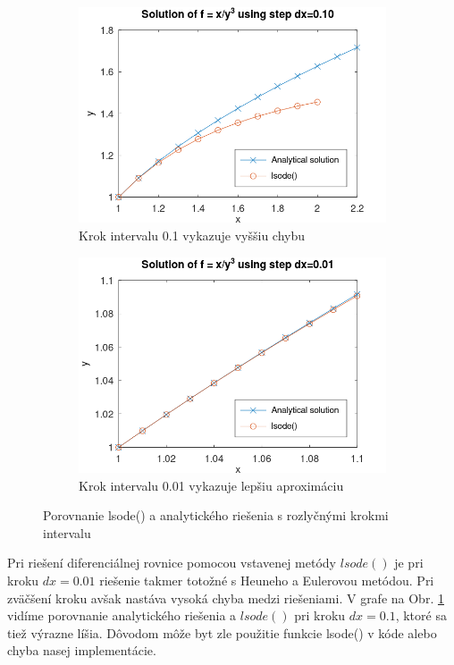 \documentclass{article}
\theoremstyle{definition}
\theoremstyle{remark}
\begin{document}
\begin{figure}[h]
  \centering
  \begin{subfigure}[b]{0.49\textwidth}
    \includegraphics[width=\textwidth]{analytical.png}
    \caption{Krok intervalu 0.1 vykazuje vyššiu chybu}
  \end{subfigure}
  \hfill
  \begin{subfigure}[b]{0.49\textwidth}
    \includegraphics[width=\textwidth]{analytical_pre.png}
    \caption{Krok intervalu 0.01 vykazuje lepšiu aproximáciu}
  \end{subfigure}
  \caption{Porovnanie lsode() a analytického riešenia s rozlyčnými krokmi intervalu}
  \label{fig:analyticallsode}
\end{figure}
Pri riešení diferenciálnej rovnice pomocou vstavenej metódy $lsode()$ je pri kroku $dx=0.01$ riešenie takmer totožné s Heuneho a Eulerovou metódou. Pri zväčšení kroku avšak nastáva vysoká chyba medzi riešeniami. V grafe na Obr. \ref{fig:analyticallsode} vidíme porovnanie analytického riešenia a $lsode()$ pri kroku $dx=0.1$, ktoré sa tiež výrazne líšia. Dôvodom môže byt zle použitie funkcie lsode() v kóde alebo chyba nasej implementácie. 
\end{document}
